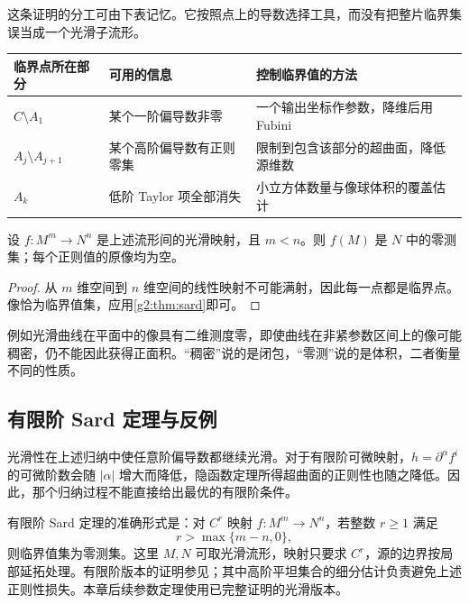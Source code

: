这条证明的分工可由下表记忆。它按照点上的导数选择工具，而没有把整片临界集误当成一个光滑子流形。

\begin{center}
	\begin{tabularx}{\textwidth}{@{}lXX@{}}
		\toprule
		临界点所在部分 & 可用的信息 & 控制临界值的方法 \\
		\midrule
		\(C\setminus A_1\) & 某个一阶偏导数非零 & 一个输出坐标作参数，降维后用 Fubini \\
		\(A_j\setminus A_{j+1}\) & 某个高阶偏导数有正则零集 & 限制到包含该部分的超曲面，降低源维数 \\
		\(A_k\) & 低阶 Taylor 项全部消失 & 小立方体数量与像球体积的覆盖估计 \\
		\bottomrule
	\end{tabularx}
\end{center}

\begin{corollary}\label{g2:cor:sard-lower-dimension}
	设 \(f:M^m\to N^n\) 是上述流形间的光滑映射，且 \(m<n\)。则 \(f(M)\) 是 \(N\) 中的零测集；每个正则值的原像均为空。
\end{corollary}
\begin{proof}
	从 \(m\) 维空间到 \(n\) 维空间的线性映射不可能满射，因此每一点都是临界点。像恰为临界值集，应用\cref{g2:thm:sard}即可。
\end{proof}

例如光滑曲线在平面中的像具有二维测度零，即使曲线在非紧参数区间上的像可能稠密，仍不能因此获得正面积。“稠密”说的是闭包，“零测”说的是体积，二者衡量不同的性质。

\subsection{有限阶 Sard 定理与反例}
\label{g2:subsec:1402:04}

光滑性在上述归纳中使任意阶偏导数都继续光滑。对于有限阶可微映射，\(h=\partial^\alpha f^i\) 的可微阶数会随 \(|\alpha|\) 增大而降低，隐函数定理所得超曲面的正则性也随之降低。因此，那个归纳过程不能直接给出最优的有限阶条件。

\ProseParagraphBreak

有限阶 Sard 定理的准确形式是：对 \(C^r\) 映射 \(f:M^m\to N^n\)，若整数 \(r\ge1\) 满足
\[
	r>\max\{m-n,0\},
\]
则临界值集为零测集。这里 \(M,N\) 可取光滑流形，映射只要求 \(C^r\)，源的边界按局部延拓处理。有限阶版本的证明参见\cite[第885--889页，定理4.1、7.2]{Sard1942}；其中高阶平坦集合的细分估计负责避免上述正则性损失。本章后续参数定理使用已完整证明的光滑版本。


